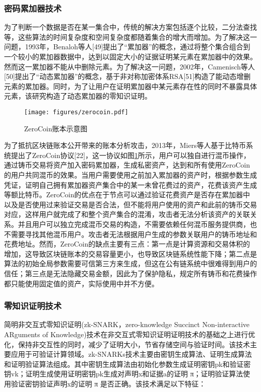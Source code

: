 \subsubsection{密码累加器技术}

为了判断一个数据是否在某一集合中，传统的解决方案包括逐个比较，二分法查找等，这些算法的时间复杂度和空间复杂度都随着集合的增大而增加。为了解决这一问题，1993年，Benaloh等人[49]提出了“累加器”的概念，通过将整个集合组合到一个较小的累加器数据中，达到以固定大小的证据证明某元素在累加器中的效果。然而这一累加器不能从中删除元素。为了解决这一问题，2002年，Camenisch等人[50]提出了“动态累加器”的概念，基于非对称加密体系RSA[51]构造了能动态增删元素的累加器。同时，为了让用户在证明累加器中某元素存在性的同时不暴露具体元素，该研究构造了动态累加器的零知识证明。 
 
\begin{figure}
\centering
\texttt{[image: figures/zerocoin.pdf]}
\caption{ZeroCoin账本示意图}
\label{fig:zerocoin}
\end{figure}

为了抵抗区块链账本公开带来的账本分析攻击，2013年，Miers等人基于比特币系统提出了ZeroCoin协议[22]，这一协议如图\ref{fig:zerocoin}所示，用户可以独自进行混币操作，通过铸币交易将资产加入密码累加器，生成私密资产，达到和所有使用ZeroCoin的用户共同混币的效果。当用户需要使用之前加入累加器的资产时，根据参数生成凭证，证明自己拥有累加器资产集合中的某一未曾花费过的资产，花费该资产生成等额比特币。ZeroCoin的优点在于节点可以通过验证花费资产是否存在累加器中以及是否使用过来验证交易是否合法，但不能将用户使用的资产和此前的铸币交易对应，这样用户就完成了和整个资产集合的混淆，攻击者无法分析该资产的关联关系。并且用户可以独立完成混币交易的构造，不需要依赖任何混币服务提供商，也不需要寻找其他混币用户。攻击者无法根据用户生成的参数关联用户的铸币地址和花费地址。然而，ZeroCoin的缺点主要有三点：第一点是计算资源和交易体积的增加，这导致区块链账本的交易容量更小，也导致区块链系统性能下降；第二点是算法的初始全局参数需要可信第三方来生成，但这在公有链系统中很难得到用户的信任；第三点是无法隐藏交易金额，因此为了保护隐私，规定所有铸币和花费操作都只能使用固定值的资产，实际使用中并不方便。

\subsubsection{零知识证明技术}

简明非交互式零知识证明(zk-SNARK，zero-knowledge Succinct Non-interactive ARguments of Knowledge)技术在非交互式零知识证明证明技术的基础之上进行优化，保持非交互性的同时，减少了证明大小，节省存储空间与验证时间。该技术主要应用于可验证计算领域。zk-SNARKs技术主要由密钥生成算法、证明生成算法和证明验证算法组成。其中密钥生成算法由初始化参数生成证明密钥pk和验证密钥vk；证明生成使用证明密钥pk生成对声明x和证据a的证明 π；证明验证算法使用验证密钥验证声明x的证明 π 是否正确。该技术满足以下特征：

